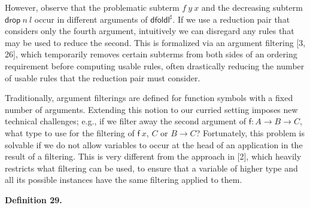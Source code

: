 \documentclass[10pt,a4paper]{amsart}
\begin{document}
 
 
However, observe that the problematic subterm ${{f}\ {y}}\ {x}$ and the decreasing subterm ${{\mathsf{drop}}\ {n}}\ {l}$ occur in different arguments of $\mathsf{dfoldl}^{\sharp}$. If we use a reduction pair that considers only the fourth argument, intuitively we can disregard any rules that may be used to reduce the second. This is formalized via an argument filtering [3, 26], which temporarily removes certain subterms from both sides of an ordering requirement before computing usable rules, often drastically reducing the number of usable rules that the reduction pair must consider.\par
 
 
 
Traditionally, argument filterings are defined for function symbols with a fixed number of arguments. Extending this notion to our curried setting imposes new technical challenges; e.g., if we filter away the second argument of $\mathsf{f}:A\rightarrow B\rightarrow C$, what type to use for the filtering of ${\mathsf{f}}\ {x}$, $C$ or $B\rightarrow C$? Fortunately, this problem is solvable if we do not allow variables to occur at the head of an application in the result of a filtering. This is very different from the approach in [2], which heavily restricts what filtering can be used, to ensure that a variable of higher type and all its possible instances have the same filtering applied to them.\par
 
 
 
\par\medskip\noindent\textbf{Definition 29.}\par
 
 
\end{document}
